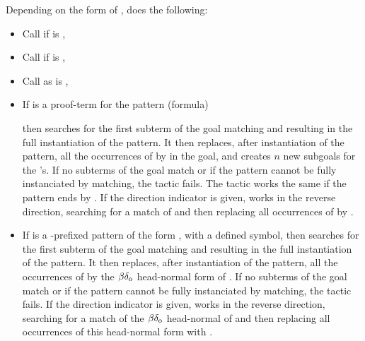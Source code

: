 Depending on the form of , \tacname{}  does the following:
  \begin{itemize}
   \item Call  if  is \ec{//},
   \item Call  if  is \ec{/=},
   \item Call  as  is \ec{//=},
   \item If  is a proof-term for the pattern (formula)
     \begin{center}
     \end{center}
     \noindent then \tacname{} searches for the first subterm of the goal
     matching  and resulting in the full instantiation of the pattern.
     It then replaces, after instantiation of the pattern, all the occurrences
     of  by  in the goal, and creates $n$ new subgoals for the
     's. If no subterms of the goal match  or if the pattern
     cannot be fully instanciated by matching, the tactic fails.
     The tactic works the same if the pattern ends by . If the
     direction indicator \ec{-} is given, \tacname{} works in the reverse
     direction, searching for a match of  and then replacing all
     occurrences of  by .
   \item If  is a \ec{/}-prefixed pattern of the form ,
     with  a defined symbol, then \tacname{} searches for the first subterm
     of the goal matching  and resulting in the full instantiation
     of the pattern. It then replaces, after instantiation of the pattern, all
     the occurrences of  by the $\beta\delta_{\rm o}$ head-normal form
     of . If no subterms of the goal match  or
     if the pattern cannot be fully instanciated by matching, the tactic fails. If the
     direction indicator \ec{-} is given, \tacname{} works in the reverse
     direction, searching for a match of the $\beta\delta_{\rm o}$ head-normal
     of  and then replacing all occurrences of this head-normal
     form with .
  \end{itemize}
  
